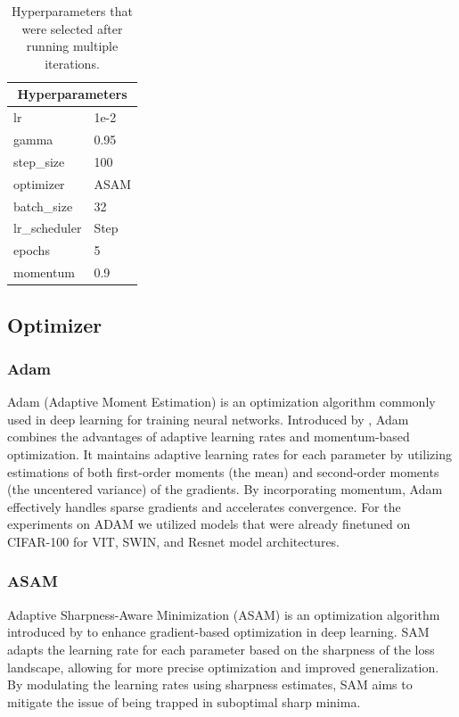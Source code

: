 \documentclass{article}
\begin{document}
\begin{table}[ht]
    \centering
    \begin{tabular}{|l|l|}
        \hline
        \multicolumn{2}{|c|}{\textbf{Hyperparameters}} \\ \hline
        lr            & 1e-2                           \\ \hline
        gamma         & 0.95                           \\ \hline
        step\_size    & 100                            \\ \hline
        optimizer     & ASAM                           \\ \hline
        batch\_size   & 32                             \\ \hline
        lr\_scheduler & Step                           \\ \hline
        epochs        & 5                              \\ \hline
        momentum      & 0.9
        \\ \hline
    \end{tabular}
    \caption{Hyperparameters that were selected after running multiple iterations.}
    \label{tab:actor_critic_hp}
\end{table}

\subsection{Optimizer}

\subsubsection{Adam}
Adam (Adaptive Moment Estimation) is an optimization algorithm commonly used in deep learning for training neural networks.
Introduced by \cite{Kingma2014AdamAM}, Adam combines the advantages of adaptive learning rates and momentum-based optimization.
It maintains adaptive learning rates for each parameter by utilizing estimations of both first-order moments (the mean) and second-order moments (the uncentered variance) of the gradients.
By incorporating momentum, Adam effectively handles sparse gradients and accelerates convergence.
For the experiments on ADAM we utilized models that were already finetuned on CIFAR-100 for VIT, SWIN, and Resnet model architectures.

\subsubsection{ASAM}
Adaptive Sharpness-Aware Minimization (ASAM) is an optimization algorithm introduced by \cite{DBLP:journals/corr/abs-2102-11600} to enhance gradient-based optimization in deep learning.
SAM adapts the learning rate for each parameter based on the sharpness of the loss landscape, allowing for more precise optimization and improved generalization.
By modulating the learning rates using sharpness estimates, SAM aims to mitigate the issue of being trapped in suboptimal sharp minima.
\end{document}
